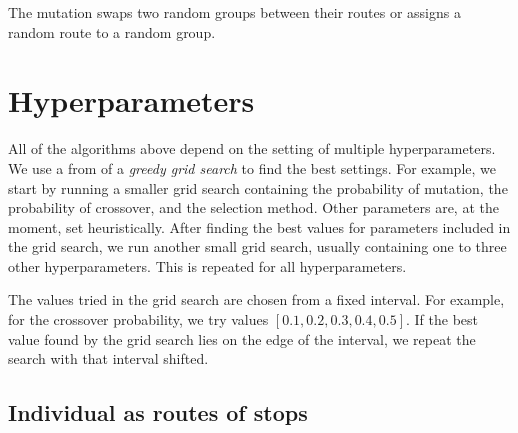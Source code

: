 The mutation swaps two random groups between their routes or assigns a random route to a random group.

\section{Hyperparameters}\label{sec:genetic_hyperparams}

All of the algorithms above depend on the setting of multiple hyperparameters. We use a from of a \textit{greedy grid search} to find the best settings. For example, we start by running a smaller grid search containing the probability of mutation, the probability of crossover, and the selection method. Other parameters are, at the moment, set heuristically. After finding the best values for parameters included in the grid search, we run another small grid search, usually containing one to three other hyperparameters. This is repeated for all hyperparameters.

The values tried in the grid search are chosen from a fixed interval. For example, for the crossover probability, we try values $[0.1, 0.2, 0.3, 0.4, 0.5]$. If the best value found by the grid search lies on the edge of the interval, we repeat the search with that interval shifted.

\subsection{Individual as routes of stops}

